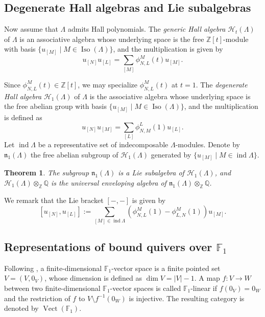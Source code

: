 \documentclass[12pt]{amsart}
\newtheorem{theorem}{Theorem}[section]
\theoremstyle{remark}
\theoremstyle{definition}
\numberwithin{equation}{section}
\newcommand{\opname}{\operatorname}
\begin{document}
\subsection{Degenerate Hall algebras and Lie subalgebras}

Now assume that $\Lambda$ admits Hall polynomials. 
The {\it generic Hall algebra}  $\mathcal{H}_t(\Lambda)$ of $\Lambda$ is an associative algebra whose underlying space is the free $\mathbb{Z}[t]$-module with basis $\{u_{[M]}\mid M\in \opname{Iso}(\Lambda)\}$, and the multiplication is given by 
\[u_{[N]}u_{[L]}=\sum_{[M]}\phi_{N,L}^M(t)u_{[M]}.
\]

Since $\phi_{N,L}^M(t)\in \mathbb{Z}[t]$, we may specialize $\phi_{N,L}^M(t)$ at $t=1$. The {\it degenerate Hall algebra} $\mathcal{H}_{1}(\Lambda)$ of $\Lambda$ is the associative algebra whose underlying space is the free abelian group with basis $\{u_{[M]}\mid M\in \opname{Iso}(\Lambda)\}$, and the multiplication is defined as
\[
u_{[N]}u_{[M]}=\sum_{[L]}\phi_{N,M}^L(1)u_{[L]}.
\]
Let $\operatorname{ind}\Lambda$ be a representative set of indecomposable $\Lambda$-modules.
Denote by $\mathfrak{n}_1(\Lambda)$  the free abelian subgroup of $\mathcal{H}_1(\Lambda)$ generated by $\{u_{[M]}\mid M\in \operatorname{ind}\Lambda\}$.
\begin{theorem}\cite{Ringel90banach,P97}
   The subgroup $\mathfrak{n}_1(\Lambda)$ is a Lie subalgebra of $\mathcal{H}_1(\Lambda)$, and $\mathcal{H}_1(\Lambda)\otimes_{\mathbb{Z}}\mathbb{Q}$ is the universal enveloping algebra of $\mathfrak{n}_1(\Lambda)\otimes_{\mathbb{Z}}\mathbb{Q}$.
\end{theorem}
We remark that the Lie bracket $[-,-]$ is given by \[[u_{[N]},u_{[L]}]:=\sum_{[M]\in \operatorname{ind}\Lambda}(\phi_{N,L}^M(1)-\phi_{L,N}^M(1))u_{[M]}.\]



\subsection{Representations of bound quivers over \texorpdfstring{$\mathbb{F}_1$}{F1}}

Following \cite{Sz12}, a finite-dimensional $\mathbb{F}_1$-vector space is a finite pointed set
$V=(V,0_V)$,
whose dimension is defined as
$\dim V=|V|-1$.
A map $f:V\to W$ between two finite-dimensional $\mathbb{F}_1$-vector spaces is called $\mathbb{F}_1$-linear if $f(0_V)=0_W$ and the restriction of $f$ to $V\setminus f^{-1}(0_W)$ is injective. The resulting category is denoted by $\operatorname{Vect} (\mathbb{F}_1)$.
\end{document}
